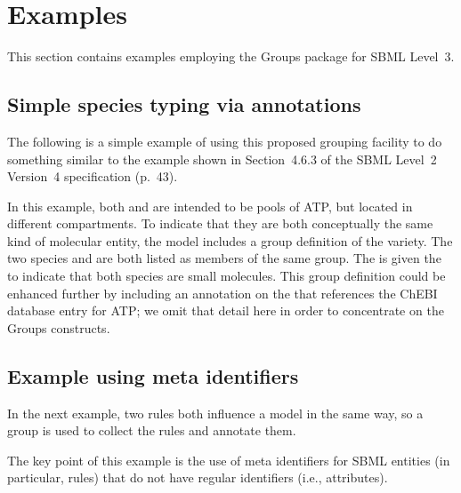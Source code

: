 
\section{Examples}
\label{examples}

This section contains examples employing the Groups package for SBML Level~3.

\subsection{Simple species typing via annotations}
\label{examples-speciestype}

The following is a simple example of using this proposed grouping facility to do something similar to the \SpeciesType example shown in Section~4.6.3 of the SBML Level~2 Version~4 specification (p.~43).

%


In this example, both  and  are intended to be pools of ATP, but located in different compartments.  To indicate that they are both conceptually the same kind of molecular entity, the model includes a group definition of the  variety.  The two species  and  are both listed as members of the same group.  The \ListOfMembers is given the   to indicate that both species are small molecules.
This group definition could be enhanced further by including an annotation on the \ListOfMembers that references the ChEBI database entry for ATP; we omit that detail here in order to concentrate on the Groups constructs.


\subsection{Example using meta identifiers}

In the next example, two rules both influence a model in the same way, so a group is used to collect the rules and annotate them.


The key point of this example is the use of meta identifiers for SBML entities (in particular, rules) that do not have regular identifiers (i.e.,  attributes).
